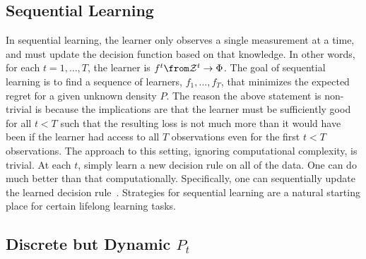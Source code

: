 \documentclass{article}
\begin{document}
\subsection{Sequential Learning}
\label{sec:constant}



In sequential learning, the learner only observes a single measurement at a time, and must update the decision function based on that knowledge.  In other words, for each $t = 1,\ldots, T$, the learner is $f^t \from \mathcal{Z}^t \to \Phi$.  
%  
The goal of sequential learning is to find a sequence of learners, $f_1, \ldots, f_T$, that minimizes the expected regret for a given unknown density $P$.  The reason the above statement is non-trivial is because the implications are that the learner must be sufficiently good for all $t<T$ such that the resulting loss is not much more than it would have been if the learner had access to all $T$ observations even for the first $t<T$ observations.
% 
The approach to this setting, ignoring computational complexity, is trivial.  At each $t$, simply learn a new decision rule on all of the data. One can do much better than that computationally.  Specifically, one can sequentially update the learned decision rule~\cite{Xiao2010-gv}. Strategies for sequential learning are a natural starting place for certain lifelong learning tasks.



\subsection{Discrete but Dynamic $P_t$}
\label{sec:jumps}
\end{document}
